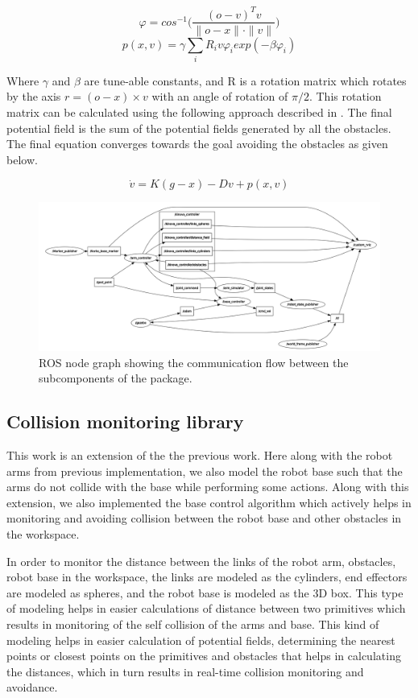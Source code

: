 \documentclass[a4paper, 11.5pt, conference]{ieeeconf}      %
\begin{document}
\begin{equation} \label{eq:2}
	\varphi = cos^{-1}\Bigg( \frac{(o-v)^T v}{\|o-x\| \cdot \|v\|}\Bigg)
\end{equation}
\begin{equation} \label{eq:3}
	p(x, v) = \gamma \sum_i R_i v \varphi_i exp(-\beta \varphi_i) 
\end{equation}

Where $\gamma$ and $\beta$ are tune-able constants, and R is a rotation matrix which rotates by the axis $r = (o-x) \times v $ with an angle of rotation of $\pi/2$. This rotation matrix can be calculated using the following approach described in \cite{rodrigues}. The final potential field is the sum of the potential fields generated by all the obstacles. The final equation converges towards the goal avoiding the obstacles as given below.

\begin{equation}
\dot{v} = K ( g - x ) - D v + p(x, v)
\end{equation}

\begin{figure}[t]
	\centering
	\includegraphics[width=1.0\linewidth, height=0.2\linewidth]{images/ros_graph.png}
	\caption{ROS node graph showing the communication flow between the subcomponents of the package.}
	\label{fig:rosgraph_single}
\end{figure}

\subsection{Collision monitoring library}
This work is an extension of the the previous work. Here along with the robot arms from previous implementation, we also model the robot base such that the arms do not collide with the base while performing some actions. Along with this extension, we also implemented the base control algorithm which actively helps in monitoring and avoiding collision between the robot base and other obstacles in the workspace.

In order to monitor the distance between the links of the robot arm, obstacles, robot base in the workspace, the links are modeled as the cylinders, end effectors are modeled as spheres, and the robot base is modeled as the 3D box. This type of modeling helps in easier calculations of distance between two primitives which results in monitoring of the self collision of the arms and base. This kind of modeling helps in easier calculation of potential fields, determining the nearest points or closest points on the primitives and obstacles that helps in calculating the distances, which in turn results in real-time collision monitoring and avoidance.
\end{document}
